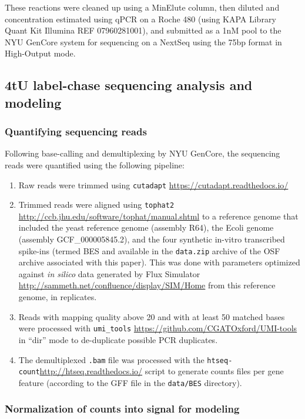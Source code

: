 These reactions were cleaned up using a MinElute column, then diluted
and concentration estimated using qPCR on a Roche 480 (using KAPA
Library Quant Kit Illumina REF 07960281001), and submitted as a 1nM pool
to the NYU GenCore system for sequencing on a NextSeq using the 75bp
format in High-Output mode.

\subsection{4tU label-chase sequencing analysis and modeling}

\subsubsection{Quantifying sequencing reads}

Following base-calling and demultiplexing by NYU GenCore, the sequencing
reads were quantified using the following pipeline:

\begin{enumerate}
  \setlength\itemsep{1em}
  \item Raw reads were trimmed using \texttt{cutadapt}
    \url{https://cutadapt.readthedocs.io/}
  \item Trimmed reads were aligned using \texttt{tophat2}
    \url{http://ccb.jhu.edu/software/tophat/manual.shtml}
    to a reference genome that included the yeast reference 
     genome (assembly R64), the Ecoli genome (assembly 
     GCF\_000005845.2), and the four synthetic in-vitro transcribed 
     spike-ins (termed BES and available in the \texttt{data.zip} 
     archive of the OSF archive associated with this paper). 
     This was done with parameters optimized 
     against \emph{in silico} data generated by Flux Simulator
     \url{http://sammeth.net/confluence/display/SIM/Home} from this 
     reference genome, in replicates.
  \item Reads with mapping quality above 20 and with at least 50 
     matched bases were processed with \texttt{umi\_tools}
     \url{https://github.com/CGATOxford/UMI-tools} in ``dir'' mode to
    de-duplicate possible PCR duplicates.
  \item The demultiplexed \texttt{.bam} file was processed with the
    \texttt{htseq-count}\url{http://htseq.readthedocs.io/}
    script to generate counts files per gene feature (according to 
    the GFF file in the \texttt{data/BES} directory).
\end{enumerate}

\subsubsection{Normalization of counts into signal for modeling}

